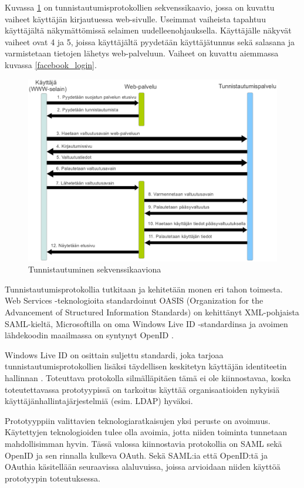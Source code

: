 Kuvassa \ref{oauth} on tunnistautumisprotokollien sekvenssikaavio, jossa on kuvattu vaiheet käyttäjän kirjautuessa web-sivulle. Useimmat vaiheista tapahtuu käyttäjältä näkymättömissä selaimen uudelleenohjauksella. Käyttäjälle näkyvät vaiheet ovat 4 ja 5, joissa käyttäjältä pyydetään käyttäjätunnus sekä salasana ja varmistetaan tietojen lähetys web-palveluun. Vaiheet on kuvattu aiemmassa kuvassa \ref{facebook_login}.

\begin{figure}[ht]
\centering
\includegraphics[width=\textwidth]{teknologiat/protokollat/oauth.eps}
\caption{Tunnistautuminen sekvenssikaaviona}%
\label{oauth}
\end{figure}

Tunnistautumisprotokollia tutkitaan ja kehitetään monen eri tahon toimesta. Web Services -teknologioita standardoinut OASIS (Organization for the Advancement of Structured Information Standards) on kehittänyt XML-pohjaista SAML-kieltä, Microsoftilla on oma Windows Live ID -standardinsa ja avoimen lähdekoodin maailmassa on syntynyt OpenID \cite{open_identity}.

Windows Live ID on osittain suljettu standardi, joka tarjoaa tunnistautumisprotokollien lisäksi täydellisen keskitetyn käyttäjän identiteetin hallinnan \cite{open_identity}. Toteuttava protokolla silmälläpitäen tämä ei ole kiinnostavaa, koska toteutettavassa prototyypissä on tarkoitus käyttää organisaatioiden nykyisiä käyttäjänhallintajärjestelmiä (esim. LDAP) hyväksi.

Prototyyppiin valittavien teknologiaratkaisujen yksi peruste on avoimuus. Käytettyjen teknologioiden tulee olla avoimia, jotta niiden toiminta tunnetaan mahdollisimman hyvin. Tässä valossa kiinnostavia protokollia on SAML sekä OpenID ja sen rinnalla kulkeva OAuth. Sekä SAML:ia että OpenID:tä ja OAuthia käsitellään seuraavissa alaluvuissa, joissa arvioidaan niiden käyttöä prototyypin toteutuksessa.